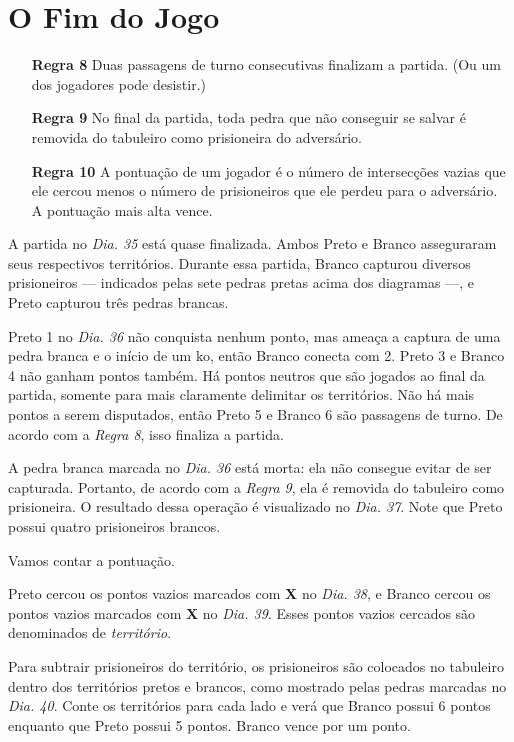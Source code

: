 \chapter{O Fim do Jogo}

\begin{itemize}
    \item[\textbf{Regra 8}] Duas passagens de turno consecutivas finalizam a partida. (Ou um dos jogadores pode desistir.)
    \item[\textbf{Regra 9}] No final da partida, toda pedra que não conseguir se salvar é removida do tabuleiro como prisioneira do adversário.
    \item[\textbf{Regra 10}] A pontuação de um jogador é o número de intersecções vazias que ele cercou menos o número de prisioneiros que ele perdeu para o adversário. A pontuação mais alta vence.
\end{itemize}


A partida no \emph{Dia. 35} está quase finalizada. Ambos Preto e Branco asseguraram seus respectivos territórios. Durante essa partida, Branco capturou diversos prisioneiros --- indicados pelas sete pedras pretas acima dos diagramas ---, e Preto capturou três pedras brancas.

Preto 1 no \emph{Dia. 36} não conquista nenhum ponto, mas ameaça a captura de uma pedra branca e o início de um ko, então Branco conecta com 2. Preto 3 e Branco 4 não ganham pontos também. Há pontos neutros que são jogados ao final da partida, somente para mais claramente delimitar os territórios. Não há mais pontos a serem disputados, então Preto 5 e Branco 6 são passagens de turno. De acordo com a \emph{Regra 8}, isso finaliza a partida.

A pedra branca marcada no \emph{Dia. 36} está morta: ela não consegue evitar de ser capturada. Portanto, de acordo com a \emph{Regra 9}, ela é removida do tabuleiro como prisioneira. O resultado dessa operação é visualizado no \emph{Dia. 37}. Note que Preto possui quatro prisioneiros brancos.

Vamos contar a pontuação.

Preto cercou os pontos vazios marcados com \textbf{X} no \emph{Dia. 38}, e Branco cercou os pontos vazios marcados com \textbf{X} no \emph{Dia. 39}. Esses pontos vazios cercados são denominados de \emph{território}.

Para subtrair prisioneiros do território, os prisioneiros são colocados no tabuleiro dentro dos territórios pretos e brancos, como mostrado pelas pedras marcadas no \emph{Dia. 40}. Conte os territórios para cada lado e verá que Branco possui 6 pontos enquanto que Preto possui 5 pontos. Branco vence por um ponto.

